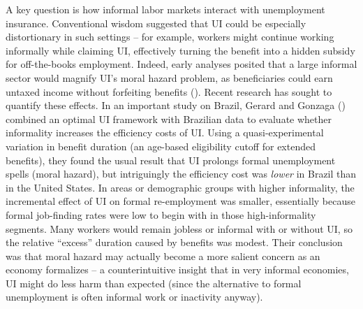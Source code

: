 \documentclass[
  4pt,
]{report}
\begin{document}
A key question is how informal labor markets interact with unemployment
insurance. Conventional wisdom suggested that UI could be especially
distortionary in such settings -- for example, workers might continue
working informally while claiming UI, effectively turning the benefit
into a hidden subsidy for off-the-books employment. Indeed, early
analyses posited that a large informal sector would magnify UI's moral
hazard problem, as beneficiaries could earn untaxed income without
forfeiting benefits (). Recent research has sought to quantify these effects.
In an important study on Brazil, Gerard and Gonzaga
() combined an optimal UI framework with
Brazilian data to evaluate whether informality increases the efficiency
costs of UI. Using a quasi-experimental variation in benefit duration
(an age-based eligibility cutoff for extended benefits), they found the
usual result that UI prolongs formal unemployment spells (moral hazard),
but intriguingly the efficiency cost was \emph{lower} in Brazil than in
the United States. In areas or demographic groups with higher
informality, the incremental effect of UI on formal re-employment was
smaller, essentially because formal job-finding rates were low to begin
with in those high-informality segments. Many workers would remain
jobless or informal with or without UI, so the relative ``excess''
duration caused by benefits was modest. Their conclusion was that moral
hazard may actually become a more salient concern as an economy
formalizes -- a counterintuitive insight that in very informal
economies, UI might do less harm than expected (since the alternative to
formal unemployment is often informal work or inactivity anyway).
\end{document}

